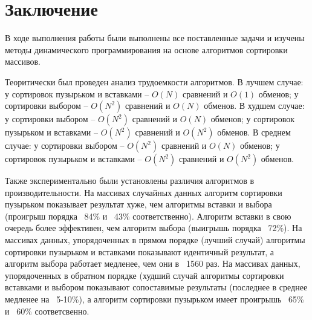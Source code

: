 \chapter*{Заключение}

В ходе выполнения работы были выполнены все поставленные задачи и изучены методы динамического программирования на основе алгоритмов сортировки массивов.

Теоритически был проведен анализ трудоемкости алгоритмов. В лучшем случае: у сортировок пузырьком и вставками -- $O(N)$ сравнений и $O(1)$ обменов; у сортировки выбором -- $O(N^2)$ сравнений и $O(N)$ обменов. В худшем случае: у сортировки выбором -- $O(N^2)$ сравнений и $O(N)$ обменов; у сортировок пузырьком и вставками -- $O(N^2)$ сравнений и $O(N^2)$ обменов. В среднем случае: у сортировки выбором -- $O(N^2)$ сравнений и $O(N)$ обменов; у сортировок пузырьком и вставками -- $O(N^2)$ сравнений и $O(N^2)$ обменов.

Также экспериментально были установлены различия алгоритмов в производительности. На массивах случайных данных алгоритм сортировки пузырьком показывает результат хуже, чем алгоритмы вставки и выбора (проигрыш порядка ~84\%  и ~43\% соответственно). Алгоритм вставки в свою очередь более эффективен, чем алгоритм выбора (выигрышь порядка ~72\%). На массивах данных, упорядоченных в прямом порядке (лучший случай) алгоритмы сортировки пузырьком и вставками показывают идентичный результат, а алгоритм выбора работает медленее, чем они в ~1560 раз. На массивах данных, упорядоченных в обратном порядке (худший случай алгоритмы сортировки вставками и выбором показывают сопоставимые результаты (последнее в среднее медленее на ~5-10\%), а алгоритм сортировки пузырьком имеет проигрышь ~65\% и ~60\% соответсвенно.

